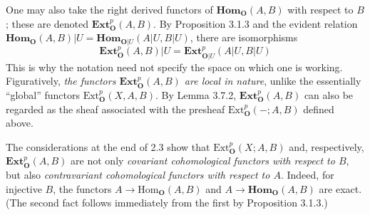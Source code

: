 One may also take the right derived functors of $\mathbf{Hom}_{\mathbf O}(A,B)$ with
respect to $B$; these are denoted $\mathbf{Ext}_{\mathbf O}^p(A,B)$. By Proposition
3.1.3 and the evident relation
$\mathbf{Hom}_{\mathbf O}(A,B)|U=\mathbf{Hom}_{{\mathbf O}|U}(A|U,B|U)$, there are isomorphisms
\[
\tag{4.2.3}
\mathbf{Ext}_{\mathbf O}^p(A,B)|U=
\mathbf{Ext}_{{\mathbf O}|U}^p(A|U,B|U)
\]
This is why the notation need not specify the space on which one is working.
Figuratively, \textit{the functors $\mathbf{Ext}_{\mathbf O}^p(A,B)$ are local in
nature}, unlike the essentially “global” functors
$\mathrm{Ext}_{\mathbf O}^p(X,A,B)$. By Lemma 3.7.2,
$\mathbf{Ext}_{\mathbf O}^p(A,B)$ can also be regarded as the sheaf associated with the
presheaf $\mathrm{Ext}_{\mathbf O}^p(-;A,B)$ defined above.

The considerations at the end of 2.3 show that
$\mathrm{Ext}_{\mathbf O}^p(X;A,B)$ and, respectively, $\mathbf{Ext}_{\mathbf O}^p(A,B)$ are not
only \textit{covariant cohomological functors with respect to $B$}, but also
\textit{contravariant cohomological functors with respect to $A$}. Indeed, for
injective $B$, the functors $A\to\mathrm{Hom}_{\mathbf O}(A,B)$ and
$A\to\mathbf{Hom}_{\mathbf O}(A,B)$ are exact. (The second fact follows
immediately from the first by Proposition 3.1.3.)

